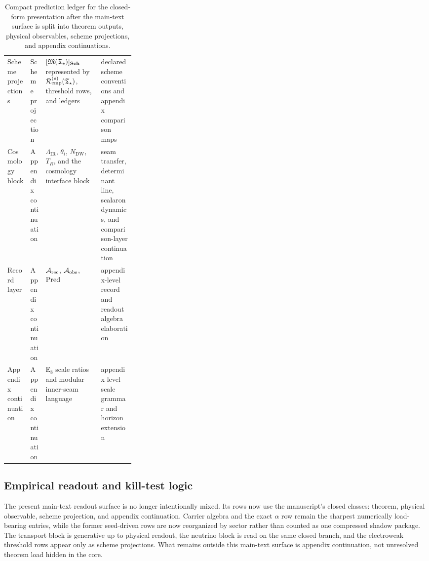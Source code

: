 \begin{table}[t]
\begin{tabularx}{\linewidth}{@{}>{\raggedright\arraybackslash}p{0.18\linewidth}>{\raggedright\arraybackslash}p{0.12\linewidth}YY@{}}
Scheme projections & Scheme projection & $[\mathfrak M(\mathfrak T_{\star})]_{\mathbf{Sch}}$ represented by $\mathcal R_{\mathrm{cmp}}^{(s)}(\mathfrak T_{\star})$, threshold rows, and ledgers & declared scheme conventions and appendix comparison maps \\
Cosmology block & Appendix continuation & $\Lambda_{\mathrm{IR}}$, $\theta_i$, $N_{\mathrm{DW}}$, $T_R$, and the cosmology interface block & seam transfer, determinant line, scalaron dynamics, and comparison-layer continuation \\
Record layer & Appendix continuation & $\mathcal A_{\mathrm{rec}}$, $\mathcal A_{\mathrm{obs}}$, $\operatorname{Pred}$ & appendix-level record and readout algebra elaboration \\
Appendix continuation & Appendix continuation & E$_8$ scale ratios and modular inner-seam language & appendix-level scale grammar and horizon extension \\
\bottomrule
\end{tabularx}
\caption{Compact prediction ledger for the closed-form presentation after the main-text surface is
split into theorem outputs, physical observables, scheme projections, and appendix continuations.}
\label{tab:prediction-ledger}
\end{table}

\subsection{Empirical readout and kill-test logic}

The present main-text readout surface is no longer intentionally mixed. Its rows now use the
manuscript's closed classes: theorem, physical observable, scheme projection, and appendix
continuation. Carrier algebra and the exact $\alpha$ row remain the sharpest numerically
load-bearing entries, while the former seed-driven rows are now reorganized by sector rather than
counted as one compressed shadow package. The transport block is generative up to physical readout,
the neutrino block is read on the same closed branch, and the electroweak threshold rows appear
only as scheme projections. What remains outside this main-text surface is appendix continuation,
not unresolved theorem load hidden in the core.


